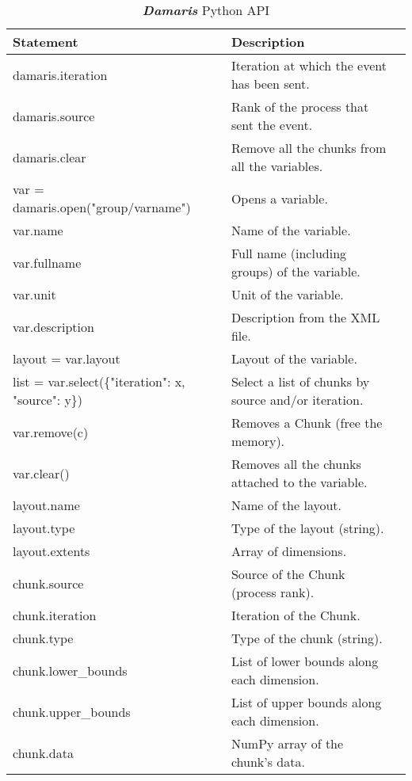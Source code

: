 \documentclass[11pt]{report}
\newcommand{\Damaris}{\emph{\textbf{Damaris}}}
\begin{document}
\begin{table}[h]
\centering{}
   \begin{tabular}{|l|l|l|}
       \hline
       Statement & Description \\
       \hline
       \hline
       damaris.iteration & Iteration at which the event has been sent. \\
       damaris.source & Rank of the process that sent the event.\\
       damaris.clear & Remove all the chunks from all the variables. \\
       var = damaris.open("group/varname") & Opens a variable.\\
       var.name & Name of the variable.\\
       var.fullname & Full name (including groups) of the variable.\\
       var.unit & Unit of the variable.\\
       var.description & Description from the XML file. \\
       layout = var.layout & Layout of the variable.\\
       list = var.select(\{"iteration": x, "source": y\}) & Select a list of chunks by source and/or iteration.\\
       var.remove(c) & Removes a Chunk (free the memory). \\
       var.clear() & Removes all the chunks attached to the variable. \\
       layout.name & Name of the layout. \\
       layout.type & Type of the layout (string). \\
       layout.extents & Array of dimensions. \\
       chunk.source & Source of the Chunk (process rank). \\
       chunk.iteration & Iteration of the Chunk. \\
       chunk.type & Type of the chunk (string). \\
       chunk.lower\_bounds & List of lower bounds along each dimension. \\
       chunk.upper\_bounds & List of upper bounds along each dimension. \\
       chunk.data & NumPy array of the chunk's data. \\
       \hline
   \end{tabular}\caption{\Damaris{} Python API}\label{tab:pythonAPI}
\end{table}
\end{document}
